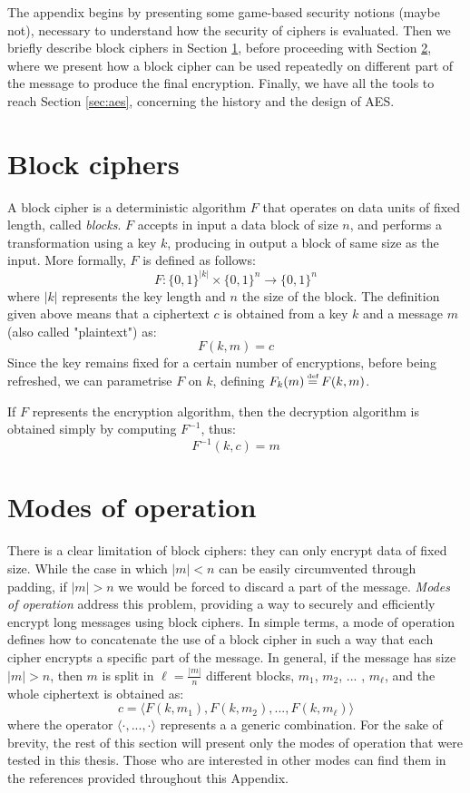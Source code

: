 \documentclass[12pt,a4paper]{book}
\newcommand\defeq{\stackrel{\mathclap{\normalfont\mbox{\tiny def}}}{=}}
\theoremstyle{definition}
\begin{document}
	The appendix begins by presenting some game-based security notions (maybe not), necessary to understand how the security of ciphers is evaluated. Then we briefly describe block ciphers in Section \ref{sec:block-ciphers}, before proceeding with Section \ref{sec:modes}, where we present how a block cipher can be used repeatedly on different part of the message to produce the final encryption. Finally, we have all the tools to reach Section \ref{sec:aes}, concerning the history and the design of AES.
	
	\section{Block ciphers}\label{sec:block-ciphers}
	A block cipher is a deterministic algorithm $F$ that operates on data units of fixed length, called \textit{blocks}. $F$ accepts in input a data block of size $n$, and performs a transformation using a key $k$, producing in output a block of same size as the input. More formally, $F$ is defined as follows:
	\[
		F: \{0,1\}^{|k|} \times \{0,1\}^n \rightarrow \{0,1\}^n
	\]
	where $|k|$ represents the key length and $n$ the size of the block. The definition given above means that a ciphertext $c$ is obtained from a key $k$ and a message $m$ (also called "plaintext") as:
	\[
		F(k,m) = c
	\]
	Since the key remains fixed for a certain number of encryptions, before being refreshed, we can parametrise $F$ on $k$, defining $F_k(m) \defeq F(k,m)$.
	
	If $F$ represents the encryption algorithm, then the decryption algorithm is obtained simply by computing $F^{-1}$, thus:
	\[
		F^{-1}(k,c) = m
	\]

	\section{Modes of operation}\label{sec:modes}
	There is a clear limitation of block ciphers: they can only encrypt data of fixed size. While the case in which $|m| < n$ can be easily circumvented through padding, if $|m| > n$ we would be forced to discard a part of the message. \textit{Modes of operation} address this problem, providing a way to securely and efficiently encrypt long messages using block ciphers. In simple terms, a mode of operation defines how to concatenate the use of a block cipher in such a way that each cipher encrypts a specific part of the message. In general, if the message has size $|m| > n$, then $m$ is split in $\ell = \frac{|m|}{n}$ different blocks, $m_1$, $m_2$, ... , $m_{\ell}$, and the whole ciphertext is obtained as:
	\[
	c = \langle F(k, m_1), F(k, m_2), ..., F(k, m_{\ell})\rangle
	\]
	where the operator $\langle \cdot , ..., \cdot \rangle$ represents a a generic combination. For the sake of brevity, the rest of this section will present only the modes of operation that were tested in this thesis. Those who are interested in other modes can find them in the references provided throughout this Appendix.
\end{document}
